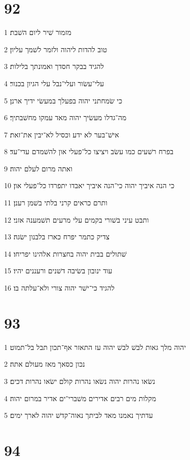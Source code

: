 \chapter{92}

\par 1 מזמור שׁיר ליום השׁבת׃
\par 2 טוב להדות ליהוה ולזמר לשׁמך עליון׃
\par 3 להגיד בבקר חסדך ואמונתך בלילות׃
\par 4 עלי־עשׂור ועלי־נבל עלי הגיון בכנור׃
\par 5 כי שׂמחתני יהוה בפעלך במעשׂי ידיך ארנן׃
\par 6 מה־גדלו מעשׂיך יהוה מאד עמקו מחשׁבתיך׃
\par 7 אישׁ־בער לא ידע וכסיל לא־יבין את־זאת׃
\par 8 בפרח רשׁעים כמו עשׂב ויציצו כל־פעלי און להשׁמדם עדי־עד׃
\par 9 ואתה מרום לעלם יהוה׃
\par 10 כי הנה איביך יהוה כי־הנה איביך יאבדו יתפרדו כל־פעלי און׃
\par 11 ותרם כראים קרני בלתי בשׁמן רענן׃
\par 12 ותבט עיני בשׁורי בקמים עלי מרעים תשׁמענה אזני׃
\par 13 צדיק כתמר יפרח כארז בלבנון ישׂגה׃
\par 14 שׁתולים בבית יהוה בחצרות אלהינו יפריחו׃
\par 15 עוד ינובון בשׂיבה דשׁנים ורעננים יהיו׃
\par 16 להגיד כי־ישׁר יהוה צורי ולא־עלתה בו׃

\chapter{93}

\par 1 יהוה מלך גאות לבשׁ לבשׁ יהוה עז התאזר אף־תכון תבל בל־תמוט׃
\par 2 נכון כסאך מאז מעולם אתה׃
\par 3 נשׂאו נהרות יהוה נשׂאו נהרות קולם ישׂאו נהרות דכים׃
\par 4 מקלות מים רבים אדירים משׁברי־ים אדיר במרום יהוה׃
\par 5 עדתיך נאמנו מאד לביתך נאוה־קדשׁ יהוה לארך ימים׃

\chapter{94}

